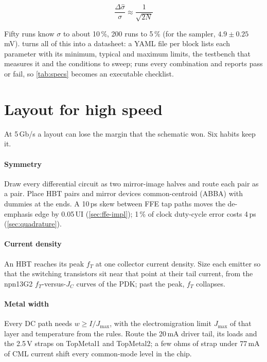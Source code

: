 \begin{keyeq}
\begin{equation}
  \frac{\Delta\hat\sigma}{\sigma}\approx\frac{1}{\sqrt{2N}}
  \label{eq:ch15-mc}
\end{equation}
\end{keyeq}

Fifty runs know $\sigma$ to about 10\,\%, 200 runs to 5\,\% (for the sampler, $4.9\pm0.25$\,mV).  turns all of this into a datasheet: a YAML file per block lists each parameter with its minimum, typical and maximum limits, the testbench that measures it and the conditions to sweep;  runs every combination and reports pass or fail, so \cref{tab:specs} becomes an executable checklist.

\section{Layout for high speed}\label{sec:layout-hs}

At 5\,Gb/s a layout can lose the margin that the schematic won. Six habits keep it.

\paragraph{Symmetry} Draw every differential circuit as two mirror-image halves and route each pair as a pair. Place HBT pairs and mirror devices common-centroid (ABBA) with dummies at the ends. A 10\,ps skew between FFE tap paths moves the de-emphasis edge by 0.05\,UI (\cref{sec:ffe-impl}); 1\,\% of clock duty-cycle error costs 4\,ps (\cref{sec:quadrature}).

\paragraph{Current density} An HBT reaches its peak $f_T$ at one collector current density. Size each emitter so that the switching transistors sit near that point at their tail current, from the npn13G2 $f_T$-versus-$J_C$ curves of the PDK; past the peak, $f_T$ collapses.

\paragraph{Metal width} Every DC path needs $w\ge I/J_\mathrm{max}$, with the electromigration limit $J_\mathrm{max}$ of that layer and temperature from the \sgx{} rules. Route the 20\,mA driver tail, its loads and the 2.5\,V straps on TopMetal1 and TopMetal2; a few ohms of strap under 77\,mA of CML current shift every common-mode level in the chip.

